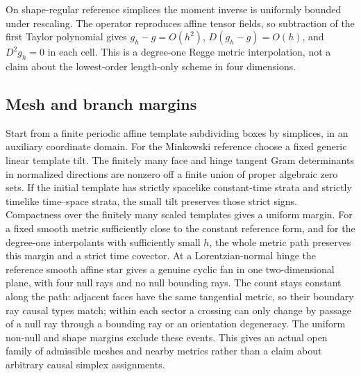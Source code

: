 \documentclass[11pt]{article}
\begin{document}
On shape-regular reference simplices the moment inverse is uniformly bounded under rescaling. The operator reproduces affine tensor fields, so subtraction of the first Taylor polynomial gives \(g_h-g=O(h^2)\), \(D(g_h-g)=O(h)\), and \(D^2g_h=0\) in each cell. This is a degree-one Regge metric interpolation, not a claim about the lowest-order length-only scheme in four dimensions.

\subsection{Mesh and branch margins}
Start from a finite periodic affine template subdividing boxes by simplices, in an auxiliary coordinate domain. For the Minkowski reference choose a fixed generic linear template tilt. The finitely many face and hinge tangent Gram determinants in normalized directions are nonzero off a finite union of proper algebraic zero sets. If the initial template has strictly spacelike constant-time strata and strictly timelike time--space strata, the small tilt preserves those strict signs. Compactness over the finitely many scaled templates gives a uniform margin. For a fixed smooth metric sufficiently close to the constant reference form, and for the degree-one interpolants with sufficiently small \(h\), the whole metric path preserves this margin and a strict time covector. At a Lorentzian-normal hinge the reference smooth affine star gives a genuine cyclic fan in one two-dimensional plane, with four null rays and no null bounding rays. The count stays constant along the path: adjacent faces have the same tangential metric, so their boundary ray causal types match; within each sector a crossing can only change by passage of a null ray through a bounding ray or an orientation degeneracy. The uniform non-null and shape margins exclude these events. This gives an actual open family of admissible meshes and nearby metrics rather than a claim about arbitrary causal simplex assignments.
\end{document}
